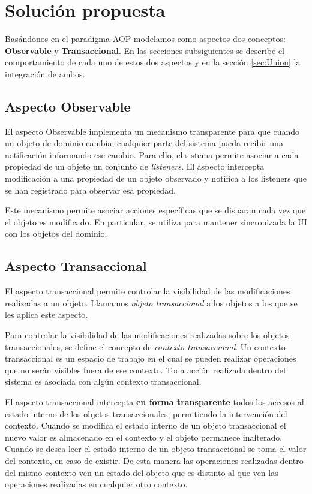 \section{Solución propuesta}
\label{Solucion}

	Basándonos en el paradigma AOP modelamos como aspectos dos conceptos: {\bf Observable} y  {\bf Transaccional}.
	En las secciones subsiguientes se describe el comportamiento de cada uno de
	estos dos aspectos y en la sección \ref{sec:Union} la integración de ambos.

	\subsection{Aspecto Observable}
	\label{aspectoObservable}
		El aspecto Observable implementa un mecanismo transparente para que cuando un
		objeto de dominio cambia, cualquier parte del sistema pueda recibir una
		notificación informando ese cambio.
		Para ello, el sistema permite asociar a cada propiedad de un objeto un conjunto de \emph{listeners}. 
		El aspecto intercepta modificación a una propiedad
		de un objeto observado y notifica a los listeners que se han registrado para observar esa propiedad.
		
		Este mecanismo permite asociar acciones específicas que se disparan cada vez
		que el objeto es modificado. En particular, se utiliza para mantener
		sincronizada la UI con los objetos del dominio.

	\subsection{Aspecto Transaccional}
	\label{aspectoTransaccional}
		El aspecto transaccional permite controlar la visibilidad de las modificaciones
		realizadas a un objeto.
		Llamamos \emph{objeto transaccional} a los objetos a los que se les aplica este aspecto.
		
		Para controlar la visibilidad de las modificaciones realizadas sobre los objetos transaccionales, 
		se define el concepto de \emph{contexto transaccional}.
		Un contexto transaccional es un espacio de trabajo en el cual se pueden
		realizar operaciones que no serán visibles fuera de ese contexto.
		Toda acción realizada dentro del sistema es asociada con algún contexto transaccional.
		
		El aspecto transaccional intercepta \textbf{en forma transparente} todos los accesos al
		estado interno de los objetos transaccionales, permitiendo la intervención del contexto.
		Cuando se modifica el estado interno de un objeto transaccional el nuevo valor es almacenado en el contexto y 
		el objeto permanece inalterado.
		Cuando se desea leer el estado interno de un objeto transaccional se toma el valor del contexto, en caso de existir.
		De esta manera las operaciones realizadas dentro del mismo contexto ven un estado del objeto que es distinto 
		al que ven las operaciones realizadas en cualquier otro contexto.
	
